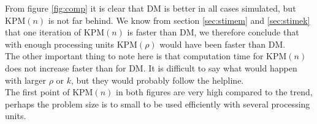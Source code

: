 From figure \ref{fig:comp} it is clear that DM is better in all cases simulated, but KPM$(n)$ is not far behind. We know from section \ref{sec:stimem} and \ref{sec:stimek} that one iteration of KPM$(n)$ is faster than DM, we therefore conclude that with enough processing units KPM$(\rho)$ would have been faster than DM. \\

The other important thing to note here is that computation time for KPM$(n)$ does not increase faster than for DM. It is difficult to say what would happen with larger $\rho$ or $k$, but they would probably follow the helpline.\\

The first point of KPM$(n)$ in both figures are very high compared to the trend, perhaps the problem size is to small to be used efficiently with several processing units. 
